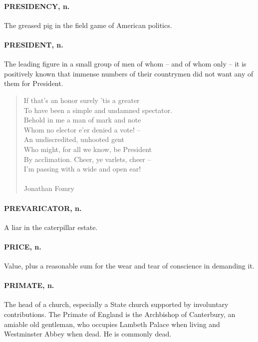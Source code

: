 \documentclass[11pt]{article}
\begin{document}
\paragraph{PRESIDENCY, n.}  The greased pig in the field game of American
politics.

\paragraph{PRESIDENT, n.}  The leading figure in a small group of men of whom --
and of whom only -- it is positively known that immense numbers of
their countrymen did not want any of them for President.

\begin{quote}   If that's an honor surely 'tis a greater \\
  To have been a simple and undamned spectator. \\
  Behold in me a man of mark and note \\
  Whom no elector e'er denied a vote! -- \\
  An undiscredited, unhooted gent \\
  Who might, for all we know, be President \\
  By acclimation.  Cheer, ye varlets, cheer -- \\
  I'm passing with a wide and open ear! \\
 \\
Jonathan Fomry \end{quote}


\paragraph{PREVARICATOR, n.}  A liar in the caterpillar estate.

\paragraph{PRICE, n.}  Value, plus a reasonable sum for the wear and tear of
conscience in demanding it.

\paragraph{PRIMATE, n.}  The head of a church, especially a State church supported
by involuntary contributions.  The Primate of England is the
Archbishop of Canterbury, an amiable old gentleman, who occupies
Lambeth Palace when living and Westminster Abbey when dead.  He is
commonly dead.
\end{document}
